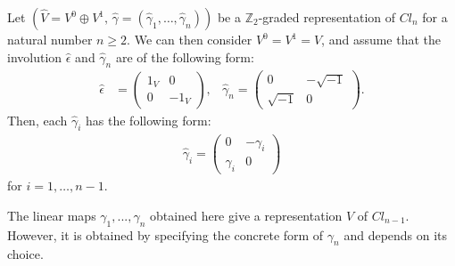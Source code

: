 \documentclass{amsart}
\theoremstyle{definition}
\theoremstyle{remark}
\begin{document}
Let \( (\hat{V} = V^0 \oplus V^1,\, \hat{\gamma} = (\hat{\gamma}_1, \ldots, \hat{\gamma}_n)) \) be a \( \mathbb{Z}_2 \)-graded representation of \( Cl_n \) for a natural number \( n \geq 2 \). We can then consider $V^{0}=V^{1}=V$, and assume that the involution $\hat{\epsilon}$ and $\hat{\gamma}_n$  are of the following form:
\begin{align*}
\hat{\epsilon}&=
\begin{pmatrix} 
  1_V & 0 \\
  0 & -1_V  
\end{pmatrix} ,&
\hat{\gamma}_n=
\begin{pmatrix} 
  0 & -\sqrt{-1} \\
  \sqrt{-1} & 0
\end{pmatrix}.
\end{align*}
Then, each $\hat{\gamma}_i$ has the following form:
\begin{align*}
\hat{\gamma}_i=
\begin{pmatrix}
0 & -\gamma_i\\
\gamma_i & 0
\end{pmatrix}
\end{align*}
for $i=1,\ldots ,n-1$.

The linear maps $\gamma_1,..., \gamma_n$ obtained here give a representation $V$ of $Cl_{n-1}$. However, it is obtained by specifying the concrete form of  $\gamma_n$ and depends on its choice.
\end{document}
